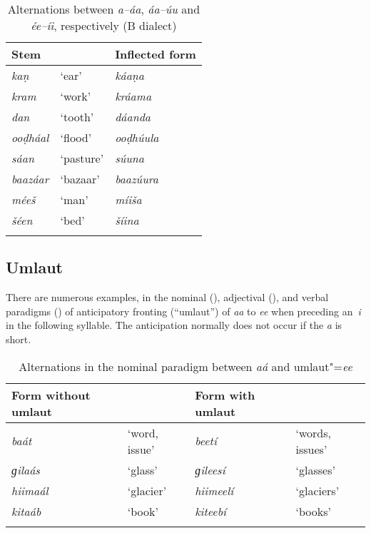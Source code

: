 \begin{table}[ht]
\caption{Alternations between \textit{a--áa}, \textit{áa--úu} and \textit{ée--íi}, respectively (B dialect)}
\begin{tabularx}{\textwidth}{ Q Q Q }
\lsptoprule
Stem &
&
Inflected form\\\hline
\textit{kaṇ} &
`ear' &
\textit{káaṇa} \\
\textit{kram} &
`work' &
\textit{kráama} \\
\textit{dan} &
`tooth' &
\textit{dáanda} \\
\textit{ooḍháal} &
`flood' &
\textit{ooḍhúula} \\
\textit{sáan} &
`pasture' &
\textit{súuna} \\
\textit{baazáar} &
`bazaar' &
\textit{baazúura} \\
\textit{méeš} &
`man' &
\textit{míiša} \\
\textit{šéen} &
`bed' &
\textit{šíina} \\\lspbottomrule
\end{tabularx}
\label{tab:3-15}
\end{table}

\subsection{Umlaut}
\label{subsec:3-5-3}

There are numerous examples, in the nominal (), adjectival (), and verbal paradigms () of anticipatory fronting (``umlaut'') of \textit{aa} to \textit{ee} when preceding an~\textit{i} in the following syllable. The anticipation normally does not occur if the \textit{a} is short. 


\begin{table}[ht]
\caption{Alternations in the nominal paradigm between \textit{aá} and umlaut"=\textit{ee} }
\begin{tabularx}{\textwidth}{ Q Q Q Q }
\lsptoprule
Form without umlaut &
&
Form with umlaut &
\\\hline
\textit{baát} &
`word, issue' &
\textit{beetí} &
`words, issues'\\
\textit{ɡilaás} &
`glass' &
\textit{ɡileesí} &
`glasses'\\
\textit{hiimaál} &
`glacier' &
\textit{hiimeelí} &
`glaciers'\\
\textit{kitaáb} &
`book' &
\textit{kiteebí} &
`books'\\\lspbottomrule
\end{tabularx}
\label{tab:3-16}
\end{table}


